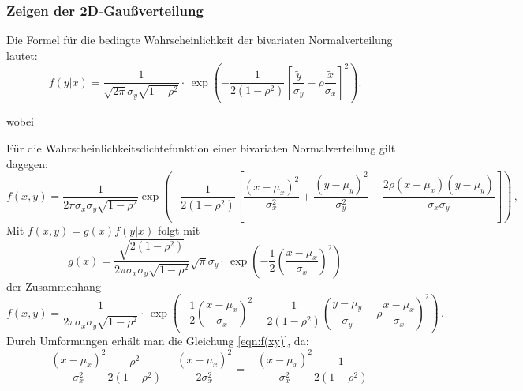 \subsubsection{Zeigen der 2D-Gaußverteilung}
Die Formel für die bedingte Wahrscheinlichkeit der bivariaten Normalverteilung lautet:
\begin{equation}
f(y\lvert x) = \frac{1}{\sqrt{2\pi} \sigma_y \sqrt{1-\rho^2}} \cdot \,
\exp\left(-\frac{1}{2(1-\rho^2)} \left [ \frac{\tilde{y}}{\sigma_y}-\rho\frac{\tilde{x}}{\sigma_x} \right]^2 \right) \text{.}
\end{equation}
\begin{center}
  \small {wobei }
\end{center}
Für die Wahrscheinlichkeitsdichtefunktion einer bivariaten Normalverteilung gilt dagegen:
\begin{equation}
f(x,y) =
      \frac{1}{2 \pi  \sigma_x \sigma_y \sqrt{1-\rho^2}}
      \exp\left(
        -\frac{1}{2(1-\rho^2)}\left[
          \frac{(x-\mu_x)^2}{\sigma_x^2} +
          \frac{(y-\mu_y)^2}{\sigma_y^2} -
          \frac{2\rho(x-\mu_x)(y-\mu_y)}{\sigma_x \sigma_y}
        \right]
      \right)\,, \label{eqn:f(xy)}
\end{equation}
Mit $f(x,y) = g(x) f(y \lvert x)$ folgt mit
\begin{equation}
g(x) = \frac{\sqrt{2(1-\rho^2)}}{2 \pi  \sigma_x \sigma_y \sqrt{1-\rho^2}} \sqrt{\pi} \sigma_y \cdot \,
       \exp\left( -\frac{1}{2} \left(\frac{x-\mu_x}{\sigma_x}\right)^2\right)
\end{equation}
der Zusammenhang
\begin{equation}
f(x,y) = \frac{1}{2 \pi  \sigma_x \sigma_y \sqrt{1-\rho^2}} \cdot \,
         \exp\left(-\frac{1}{2} \left(\frac{x-\mu_x}{\sigma_x}\right)^2
         - \frac{1}{2(1-\rho^2)} \left(\frac{y-\mu_y}{\sigma_y}-\rho\frac{x-\mu_x}{\sigma_x} \right)^2\right)\,.
\end{equation}
Durch Umformungen erhält man die Gleichung \eqref{eqn:f(xy)}, da:
\begin{equation}
  -\frac{(x-\mu_x)^2}{\sigma_x^2} \frac{\rho^2}{2(1-\rho^2)} - \frac{(x-\mu_x)^2}{2\sigma_x^2} = - \frac{(x-\mu_x)^2}{\sigma_x^2} \frac{1}{2(1-\rho^2)}
\end{equation}

